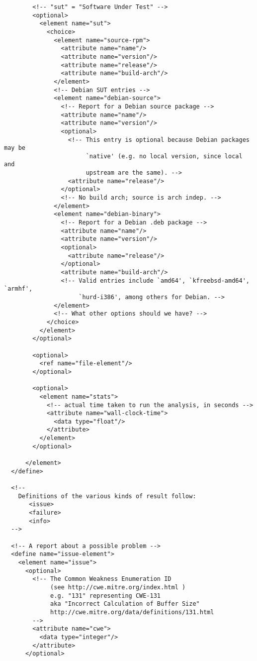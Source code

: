 \begin{lstlisting}
        <!-- "sut" = "Software Under Test" -->
        <optional>
          <element name="sut">
            <choice>
              <element name="source-rpm">
                <attribute name="name"/>
                <attribute name="version"/>
                <attribute name="release"/>
                <attribute name="build-arch"/>
              </element>
              <!-- Debian SUT entries -->
              <element name="debian-source">
                <!-- Report for a Debian source package -->
                <attribute name="name"/>
                <attribute name="version"/>
                <optional>
                  <!-- This entry is optional because Debian packages may be
                       `native' (e.g. no local version, since local and
                       upstream are the same). -->
                  <attribute name="release"/>
                </optional>
                <!-- No build arch; source is arch indep. -->
              </element>
              <element name="debian-binary">
                <!-- Report for a Debian .deb package -->
                <attribute name="name"/>
                <attribute name="version"/>
                <optional>
                  <attribute name="release"/>
                </optional>
                <attribute name="build-arch"/>
                <!-- Valid entries include `amd64', `kfreebsd-amd64', `armhf',
                     `hurd-i386', among others for Debian. -->
              </element>
              <!-- What other options should we have? -->
            </choice>
          </element>
        </optional>

        <optional>
          <ref name="file-element"/>
        </optional>

        <optional>
          <element name="stats">
            <!-- actual time taken to run the analysis, in seconds -->
            <attribute name="wall-clock-time">
              <data type="float"/>
            </attribute>
          </element>
        </optional>

      </element>
  </define>

  <!--
    Definitions of the various kinds of result follow:
       <issue>
       <failure>
       <info>
  -->

  <!-- A report about a possible problem -->
  <define name="issue-element">
    <element name="issue">
      <optional>
        <!-- The Common Weakness Enumeration ID
             (see http://cwe.mitre.org/index.html )
             e.g. "131" representing CWE-131
             aka "Incorrect Calculation of Buffer Size"
             http://cwe.mitre.org/data/definitions/131.html
        -->
        <attribute name="cwe">
          <data type="integer"/>
        </attribute>
      </optional>


\end{lstlisting}
